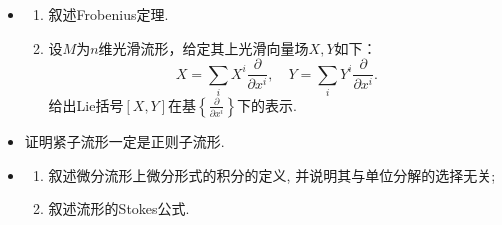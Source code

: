 \begin{itemize}
    \item[6.]
    \begin{enumerate}
        \item[(1)]叙述Frobenius定理.
        \item[(2)]设$M$为$n$维光滑流形，给定其上光滑向量场$X,Y$如下：
        \[
        X=\sum_iX^i\frac{\partial}{\partial x^i},\quad Y=\sum_iY^i\frac{\partial}{\partial x^i}.
        \]
        给出Lie括号$[X,Y]$在基$\displaystyle\left\{\frac{\partial}{\partial x^i}\right\}$下的表示.
    \end{enumerate}
    
    \item[7.]证明紧子流形一定是正则子流形.
    
    \item[8.]
    \begin{enumerate}
        \item[(1)]叙述微分流形上微分形式的积分的定义, 并说明其与单位分解的选择无关;
        \item[(2)]叙述流形的Stokes公式.
    \end{enumerate}
\end{itemize}
